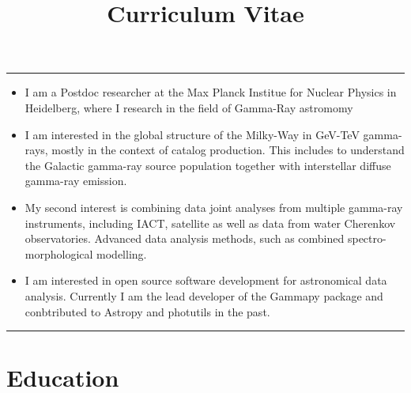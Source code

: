 \documentclass[11pt,a4paper,sans]{moderncv}        %
\title{Curriculum Vitae}                               %
\begin{document}
\makecvtitle

\centering\textcolor{color1}{\rule{16cm}{1pt}}

\begin{multicols}{2}
\begin{itemize}
\item I am a Postdoc researcher at the Max Planck Institue for Nuclear Physics in Heidelberg, where I research in the field of Gamma-Ray astromomy
\item I am interested in the global structure of the Milky-Way in GeV-TeV gamma-rays, mostly in the context of catalog production. This includes to understand the Galactic gamma-ray source population together with interstellar diffuse gamma-ray emission.   
\item My second interest is combining data joint analyses from multiple gamma-ray instruments, including
IACT, satellite as well as data from water Cherenkov observatories. Advanced data analysis methods, such as
combined spectro-morphological modelling.
\item I am interested in open source software development for astronomical data analysis. Currently I am the lead developer of the Gammapy package and conbtributed to Astropy and photutils in the past.
\end{itemize}
\end{multicols}

\centering\textcolor{color1}{\rule{16cm}{1pt}}

\section{\textbf{Education}}
\end{document}
